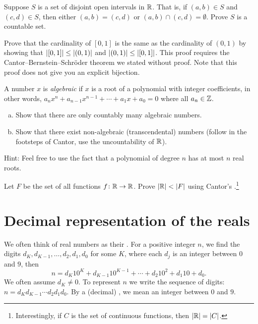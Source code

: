 \begin{exercise}
Suppose $S$ is a set of disjoint open intervals in ${\mathbb{R}}$.  That is, 
if $(a,b) \in S$ and $(c,d) \in S$, then either $(a,b) = (c,d)$
or $(a,b) \cap (c,d) = \emptyset$.  Prove $S$ is a countable set.
\end{exercise}

\begin{exercise}
Prove that the cardinality of $[0,1]$ is the same as the cardinality of
$(0,1)$ by showing that
$\left\lvert {[0,1]} \right\rvert \leq \left\lvert {(0,1)} \right\rvert$ and
$\left\lvert {(0,1)} \right\rvert \leq \left\lvert {[0,1]} \right\rvert$. This proof requires the Cantor--Bernstein--Schr\"oder theorem we
stated without proof.  Note that this proof does not give you an
explicit bijection.
\end{exercise}

\begin{exercise}[Challenging]
A number $x$ is \emph{algebraic} if $x$ is a root of a polynomial with
integer coefficients, in other words, $a_n x^n + a_{n-1} x^{n-1}  + \cdots
+ a_1 x + a_0 = 0$ where all $a_n \in {\mathbb{Z}}$.
\begin{enumerate}[a)]
\item
Show that there are only
countably many algebraic numbers.
\item
Show that there exist non-algebraic (transcendental)
numbers (follow in the footsteps of Cantor, use the uncountability of ${\mathbb{R}}$).
\end{enumerate}
Hint: Feel free to use the fact that a polynomial of degree $n$ has at most $n$ real
roots.
\end{exercise}

\begin{exercise}[Challenging]
Let $F$ be the set of all functions $f \colon {\mathbb{R}} \to {\mathbb{R}}$.
Prove $\left\lvert {{\mathbb{R}}} \right\rvert < \left\lvert {F} \right\rvert$
using Cantor's .\footnote{Interestingly,
if $C$ is the set of continuous functions, then $\left\lvert {{\mathbb{R}}} \right\rvert = \left\lvert {C} \right\rvert$.}
\end{exercise}


\sectionnewpage
\section{Decimal representation of the reals}
\label{sec:decimals}


We often think of real numbers as their
\emph{}.  For
a positive integer $n$, we find the digits $d_K,d_{K-1},\ldots,d_2,d_1,d_0$ for some
$K$,
where each $d_j$ is an integer between $0$ and $9$, then
\begin{equation*}
n = d_K {10}^K + d_{K-1} {10}^{K-1} + \cdots + d_2 {10}^2 + d_1 10 + d_0 .
\end{equation*}
We often assume $d_K \not= 0$.  To represent $n$ we write the sequence of
digits: $n = d_K d_{K-1} \cdots d_2 d_1 d_0$.
By a (decimal)
\emph{}, we mean an integer
between $0$ and $9$.

